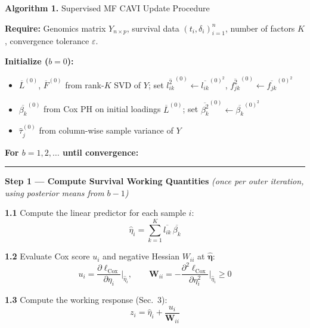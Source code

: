 \documentclass{article}[12pt]
\begin{document}
\bigskip

\begin{algobox}{\textbf{Algorithm 1.} Supervised MF CAVI Update Procedure}

\textbf{Require:} Genomics matrix $Y_{n\times p}$, survival data $(t_i, \delta_i)_{i=1}^n$,
number of factors $K$, convergence tolerance $\varepsilon$.

\medskip
\textbf{Initialize ($b=0$):}
\begin{itemize}[noitemsep, topsep=2pt, leftmargin=2em]
    \item $\overline{L}^{(0)}$, $\overline{F}^{(0)}$ from rank-$K$ SVD of $Y$; set
          $\overline{l_{ik}^2}^{(0)} \leftarrow \overline{l_{ik}}^{(0)^2}$,
          $\overline{f_{jk}^2}^{(0)} \leftarrow \overline{f_{jk}}^{(0)^2}$
    \item $\overline{\beta_k}^{(0)}$ from Cox PH on initial loadings $\overline{L}^{(0)}$; set
          $\overline{\beta_k^2}^{(0)} \leftarrow \overline{\beta_k}^{(0)^2}$
    \item $\hat{\tau}_j^{(0)}$ from column-wise sample variance of $Y$
\end{itemize}

\bigskip
\textbf{For $b = 1, 2, \ldots$ until convergence:}

\medskip
\hrule
\medskip

\hspace{1em}\textbf{Step 1 --- Compute Survival Working Quantities}
\quad\textit{(once per outer iteration, using posterior means from $b-1$)}

\medskip
\hspace{2em}\textbf{1.1}\hspace{0.5em} Compute the linear predictor for each sample $i$:
\[
    \hat{\eta}_i = \sum_{k=1}^{K} \overline{l_{ik}}\,\overline{\beta_k}
\]

\hspace{2em}\textbf{1.2}\hspace{0.5em} Evaluate Cox score $u_i$ and negative Hessian $W_{ii}$ at $\hat{\bm{\eta}}$:
\[
    u_i = \frac{\partial\ell_{\text{Cox}}}{\partial\eta_i}\Bigg|_{\hat{\eta}_i},
    \qquad
    \mathbf{W}_{ii} = -\frac{\partial^2\ell_{\text{Cox}}}{\partial\eta_i^2}\Bigg|_{\hat{\eta}_i} \geq 0
\]

\hspace{2em}\textbf{1.3}\hspace{0.5em} Compute the working response (Sec.~3):
\[
    z_i = \hat{\eta}_i + \frac{u_i}{\mathbf{W}_{ii}}
\]


\end{algobox}
\end{document}
